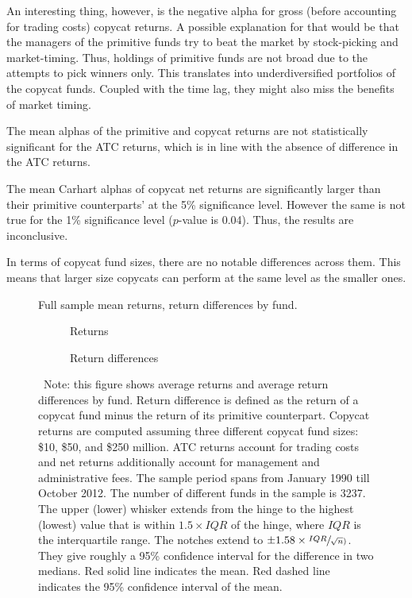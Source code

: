 \documentclass[12pt, a4]{article}
\begin{document}
An interesting thing, however, is the negative alpha for gross (before accounting for trading costs) copycat returns. A possible explanation for that would be that the managers of the primitive funds try to beat the market by stock-picking and market-timing. Thus, holdings of primitive funds are not broad due to the attempts to pick winners only. This translates into underdiversified portfolios of the copycat funds. Coupled with the time lag, they might also miss the benefits of market timing.

The mean alphas of the primitive and copycat returns are not statistically significant for the \textsc{ATC} returns, which is in line with the absence of difference in the \textsc{ATC} returns.

The mean Carhart alphas of copycat net returns are significantly larger than their primitive counterparts' at the 5\% significance level. However the same is not true for the 1\% significance level ($p$-value is \num{0.04}). Thus, the results are inconclusive.

In terms of copycat fund sizes, there are no notable differences across them. This means that larger size copycats can perform at the same level as the smaller ones.

\begin{figure}
	\centering
	\caption{Full sample mean returns, return differences by fund.}
	\label{fig:boxplot-returns-funds}
	\begin{subfigure}[t]{\linewidth}
		
		\caption{Returns}
		\label{fig:boxplot-returns-funds-returns}
	\end{subfigure}
	
	\begin{subfigure}[b]{\linewidth}
		
		\caption{Return differences}
		\label{fig:boxplot-returns-funds-diff}	
	\end{subfigure}
	\caption*{\scriptsize ~Note: this figure shows average returns and average return differences by fund. Return difference is defined as the return of a copycat fund minus the return of its primitive counterpart. Copycat returns are computed assuming three different copycat fund sizes: \$10, \$50, and \$250 million. \textsc{ATC} returns account for trading costs and net returns additionally account for management and administrative fees. The sample period spans from January 1990 till October 2012. The number of different funds in the sample is 3237. The upper (lower) whisker extends from the hinge to the highest (lowest) value that is within $1.5 \times IQR$ of the hinge, where $IQR$ is the interquartile range. The notches extend to $\pm 1.58 \times \sfrac{IQR}{\sqrt{n})}$. They give roughly a 95\% confidence interval for the difference in two medians. Red solid line indicates the mean. Red dashed line indicates the 95\% confidence interval of the mean. }
\end{figure}
\end{document}
